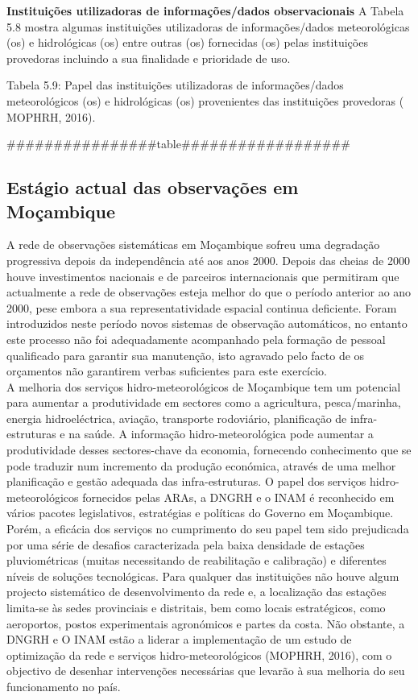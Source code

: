 \documentclass[
]{book}
\begin{document}
\textbf{Instituições utilizadoras de informações/dados observacionais}
A Tabela 5.8 mostra algumas instituições utilizadoras de informações/dados meteorológicas (os) e hidrológicas (os) entre outras (os) fornecidas (os) pelas instituições provedoras incluindo a sua finalidade e prioridade de uso.

Tabela 5.9: Papel das instituições utilizadoras de informações/dados meteorológicos (os) e hidrológicas (os) provenientes das instituições provedoras ( MOPHRH, 2016).

\#\#\#\#\#\#\#\#\#\#\#\#\#\#\#\#table\#\#\#\#\#\#\#\#\#\#\#\#\#\#\#\#\#\#

\hypertarget{estuxe1gio-actual-das-observauxe7uxf5es-em-mouxe7ambique}{%
\subsection{Estágio actual das observações em Moçambique}\label{estuxe1gio-actual-das-observauxe7uxf5es-em-mouxe7ambique}}

A rede de observações sistemáticas em Moçambique sofreu uma degradação progressiva depois da independência até aos anos 2000. Depois das cheias de 2000 houve investimentos nacionais e de parceiros internacionais que permitiram que actualmente a rede de observações esteja melhor do que o período anterior ao ano 2000, pese embora a sua representatividade espacial continua deficiente. Foram introduzidos neste período novos sistemas de observação automáticos, no entanto este processo não foi adequadamente acompanhado pela formação de pessoal qualificado para garantir sua manutenção, isto agravado pelo facto de os orçamentos não garantirem verbas suficientes para este exercício.\\
A melhoria dos serviços hidro-meteorológicos de Moçambique tem um potencial para aumentar a produtividade em sectores como a agricultura, pesca/marinha, energia hidroeléctrica, aviação, transporte rodoviário, planificação de infra-estruturas e na saúde. A informação hidro-meteorológica pode aumentar a produtividade desses sectores-chave da economia, fornecendo conhecimento que se pode traduzir num incremento da produção económica, através de uma melhor planificação e gestão adequada das infra-estruturas.
O papel dos serviços hidro-meteorológicos fornecidos pelas ARAs, a DNGRH e o INAM é reconhecido em vários pacotes legislativos, estratégias e políticas do Governo em Moçambique. Porém, a eficácia dos serviços no cumprimento do seu papel tem sido prejudicada por uma série de desafios caracterizada pela baixa densidade de estações pluviométricas (muitas necessitando de reabilitação e calibração) e diferentes níveis de soluções tecnológicas. Para qualquer das instituições não houve algum projecto sistemático de desenvolvimento da rede e, a localização das estações limita-se às sedes provinciais e distritais, bem como locais estratégicos, como aeroportos, postos experimentais agronómicos e partes da costa. Não obstante, a DNGRH e O INAM estão a liderar a implementação de um estudo de optimização da rede e serviços hidro-meteorológicos (MOPHRH, 2016), com o objectivo de desenhar intervenções necessárias que levarão à sua melhoria do seu funcionamento no país.
\end{document}
